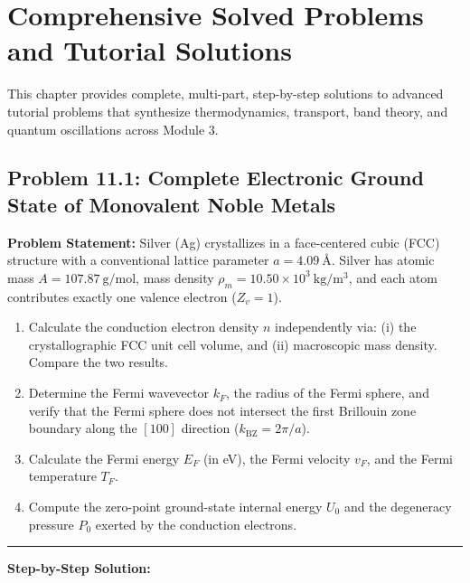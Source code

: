 \documentclass[11pt,a4paper]{article}
\begin{document}
\clearpage


\section{Comprehensive Solved Problems and Tutorial Solutions}
\label{sec:capstone_problems}

\noindent This chapter provides complete, multi-part, step-by-step solutions to advanced tutorial problems that synthesize thermodynamics, transport, band theory, and quantum oscillations across Module 3.

\vspace{0.3cm}

\subsection{Problem 11.1: Complete Electronic Ground State of Monovalent Noble Metals}
\textbf{Problem Statement:}
Silver (Ag) crystallizes in a face-centered cubic (FCC) structure with a conventional lattice parameter $a = 4.09\ \text{\AA}$. Silver has atomic mass $A = 107.87\ \mathrm{g/mol}$, mass density $\rho_m = 10.50 \times 10^3\ \mathrm{kg/m^3}$, and each atom contributes exactly one valence electron ($Z_v = 1$).
\begin{enumerate}[label=(\alph*)]
    \item Calculate the conduction electron density $n$ independently via: (i) the crystallographic FCC unit cell volume, and (ii) macroscopic mass density. Compare the two results.
    \item Determine the Fermi wavevector $k_F$, the radius of the Fermi sphere, and verify that the Fermi sphere does not intersect the first Brillouin zone boundary along the $[100]$ direction ($k_{\mathrm{BZ}} = 2\pi/a$).
    \item Calculate the Fermi energy $E_F$ (in eV), the Fermi velocity $v_F$, and the Fermi temperature $T_F$.
    \item Compute the zero-point ground-state internal energy $U_0$ and the degeneracy pressure $P_0$ exerted by the conduction electrons.
\end{enumerate}

\vspace{0.2cm}\hrule\vspace{0.2cm}
\textbf{Step-by-Step Solution:}
\end{document}
